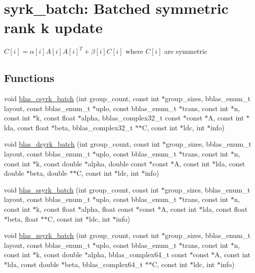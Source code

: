 \hypertarget{group__syrk__batch}{}\section{syrk\+\_\+batch\+: Batched symmetric rank k update}
\label{group__syrk__batch}


$ C[i] = \alpha[i] A[i] A[i]^T + \beta[i] C[i] $ where $ C[i] $ are symmetric  


\subsection*{Functions}
\begin{DoxyCompactItemize}
\item 
void \hyperlink{group__syrk__batch_gadd9f099fe76b3257fc81a9dc3a6b38c8}{blas\+\_\+csyrk\+\_\+batch} (int group\+\_\+count, const int $\ast$group\+\_\+sizes, bblas\+\_\+enum\+\_\+t layout, const bblas\+\_\+enum\+\_\+t $\ast$uplo, const bblas\+\_\+enum\+\_\+t $\ast$trans, const int $\ast$n, const int $\ast$k, const float $\ast$alpha, bblas\+\_\+complex32\+\_\+t const $\ast$const $\ast$A, const int $\ast$lda, const float $\ast$beta, bblas\+\_\+complex32\+\_\+t $\ast$$\ast$C, const int $\ast$ldc, int $\ast$info)
\item 
void \hyperlink{group__syrk__batch_gad68fb19e3fc8cc2d118be659cecae1a5}{blas\+\_\+dsyrk\+\_\+batch} (int group\+\_\+count, const int $\ast$group\+\_\+sizes, bblas\+\_\+enum\+\_\+t layout, const bblas\+\_\+enum\+\_\+t $\ast$uplo, const bblas\+\_\+enum\+\_\+t $\ast$trans, const int $\ast$n, const int $\ast$k, const double $\ast$alpha, double const $\ast$const $\ast$A, const int $\ast$lda, const double $\ast$beta, double $\ast$$\ast$C, const int $\ast$ldc, int $\ast$info)
\item 
void \hyperlink{group__syrk__batch_ga67e4827aa5b548bf5d43cc254c363819}{blas\+\_\+ssyrk\+\_\+batch} (int group\+\_\+count, const int $\ast$group\+\_\+sizes, bblas\+\_\+enum\+\_\+t layout, const bblas\+\_\+enum\+\_\+t $\ast$uplo, const bblas\+\_\+enum\+\_\+t $\ast$trans, const int $\ast$n, const int $\ast$k, const float $\ast$alpha, float const $\ast$const $\ast$A, const int $\ast$lda, const float $\ast$beta, float $\ast$$\ast$C, const int $\ast$ldc, int $\ast$info)
\item 
void \hyperlink{group__syrk__batch_ga2765c5d533bf4f4f394102892bfabceb}{blas\+\_\+zsyrk\+\_\+batch} (int group\+\_\+count, const int $\ast$group\+\_\+sizes, bblas\+\_\+enum\+\_\+t layout, const bblas\+\_\+enum\+\_\+t $\ast$uplo, const bblas\+\_\+enum\+\_\+t $\ast$trans, const int $\ast$n, const int $\ast$k, const double $\ast$alpha, bblas\+\_\+complex64\+\_\+t const $\ast$const $\ast$A, const int $\ast$lda, const double $\ast$beta, bblas\+\_\+complex64\+\_\+t $\ast$$\ast$C, const int $\ast$ldc, int $\ast$info)
\end{DoxyCompactItemize}


